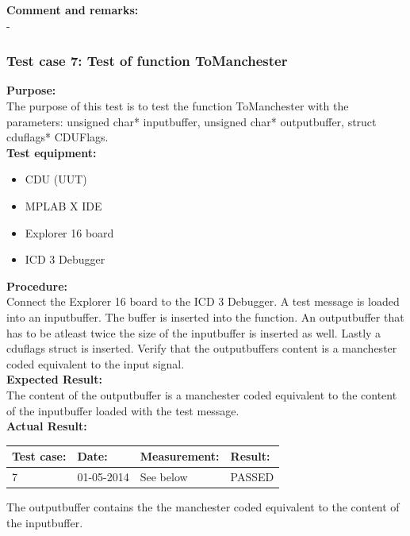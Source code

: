 \textbf{Comment and remarks:}\\
-\\

\subsubsection{Test case 7: Test of function ToManchester }
\textbf{Purpose:}\\
The purpose of this test is to test the function ToManchester with the parameters: unsigned char* inputbuffer, unsigned char* outputbuffer, struct cduflags* CDUFlags.\\

\textbf{Test equipment:}
\begin{itemize}
\item CDU (UUT)
\item MPLAB X IDE
\item Explorer 16 board
\item ICD 3 Debugger
\end{itemize}

\textbf{Procedure:}\\
Connect the Explorer 16 board to the ICD 3 Debugger. A test message is loaded into an inputbuffer. The buffer is inserted into the function. An outputbuffer that has to be atleast twice the size of the inputbuffer is inserted as well. Lastly a cduflags struct is inserted. Verify that the outputbuffers content is a manchester coded equivalent to the input signal.\\

\textbf{Expected Result:}\\
The content of the outputbuffer is a manchester coded equivalent to the content of the inputbuffer loaded with the test message.\\

\textbf{Actual Result:}\\
\begin{table}[H]
\centering
\begin{tabular}{|p{2cm}|p{2cm}|p{3cm}|p{2cm}|}\hline
\textbf{Test case:} & \textbf{Date:} & \textbf{Measurement:} & \textbf{Result:} \\ \hline
7 & 01-05-2014 & See below & PASSED \\ \hline
\end{tabular}
\end{table}
The outputbuffer contains the the manchester coded equivalent to the content of the inputbuffer.\\

